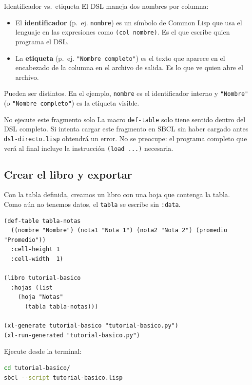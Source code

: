 \documentclass[12pt,a4paper]{report}
\begin{document}
\begin{infobox}{Identificador vs.\ etiqueta}
  El DSL maneja dos nombres por columna:
  \begin{itemize}
    \item El \textbf{identificador} (p.\ ej. \texttt{nombre}) es un
      símbolo de Common Lisp que usa el lenguaje en las expresiones
      como \texttt{(col nombre)}.  Es el que escribe quien programa
      el DSL.
    \item La \textbf{etiqueta} (p.\ ej. \texttt{"Nombre completo"}) es
      el texto que aparece en el encabezado de la columna en el archivo
      de salida.  Es lo que ve quien abre el archivo.
  \end{itemize}
  Pueden ser distintos.  En el ejemplo, \texttt{nombre} es el
  identificador interno y \texttt{"Nombre"} (o \texttt{"Nombre
    completo"}) es la etiqueta visible.
\end{infobox}

\begin{advertencia}{No ejecute este fragmento solo}
  La macro \texttt{def-table} solo tiene sentido dentro del DSL completo.
  Si intenta cargar este fragmento en SBCL sin haber cargado antes
  \texttt{dsl-directo.lisp} obtendrá un error.  No se preocupe: el
  programa completo que verá al final incluye la instrucción
  \texttt{(load ...)} necesaria.
\end{advertencia}

\subsection{Crear el libro y exportar}

Con la tabla definida, creamos un libro con una hoja que contenga la
tabla.  Como aún no tenemos datos, el \texttt{tabla} se escribe sin
\texttt{:data}.

\begin{lstlisting}[caption={Paso 1: libro con tabla vacía.}]
(def-table tabla-notas
  ((nombre "Nombre") (nota1 "Nota 1") (nota2 "Nota 2") (promedio "Promedio"))
  :cell-height 1
  :cell-width  1)

(libro tutorial-basico
  :hojas (list
    (hoja "Notas"
      (tabla tabla-notas)))

(xl-generate tutorial-basico "tutorial-basico.py")
(xl-run-generated "tutorial-basico.py")
\end{lstlisting}

\noindent Ejecute desde la terminal:

\begin{lstlisting}[language=bash, numbers=none, backgroundcolor=\color{gray!10},
                   basicstyle=\ttfamily\small]
cd tutorial-basico/
sbcl --script tutorial-basico.lisp
\end{lstlisting}
\end{document}
